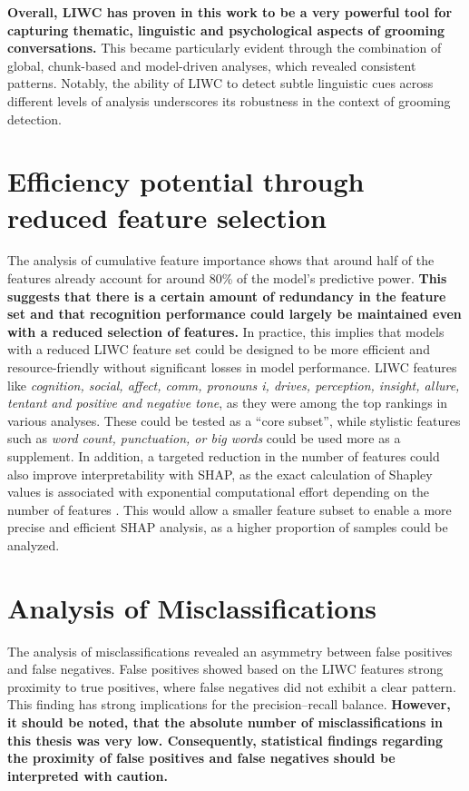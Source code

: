 \textbf{Overall, LIWC has proven in this work to be a very powerful tool for capturing thematic, linguistic and psychological aspects of grooming conversations.} This became particularly evident through the combination of global, chunk-based and model-driven analyses, which revealed consistent patterns. Notably, the ability of LIWC to detect subtle linguistic cues across different levels of analysis underscores its robustness in the context of grooming detection.

\section{Efficiency potential through reduced feature selection}

The analysis of cumulative feature importance shows that around half of the features already account for around 80\% of the model's predictive power. \textbf{This suggests that there is a certain amount of redundancy in the feature set and that recognition performance could largely be maintained even with a reduced selection of features.} In practice, this implies that models with a reduced LIWC feature set could be designed to be more efficient and resource-friendly without significant losses in model performance. LIWC features like \textit{cognition, social, affect, comm, pronouns i, drives, perception, insight, allure, tentant and positive and negative tone}, as they were among the top rankings in various analyses. These could be tested as a “core subset”, while stylistic features such as \textit{word count, punctuation, or big words} could be used more as a supplement. In addition, a targeted reduction in the number of features could also improve interpretability with SHAP, as the exact calculation of Shapley values is associated with exponential computational effort depending on the number of features \cite{fryer2021shapley}. This would allow a smaller feature subset to enable a more precise and efficient SHAP analysis, as a higher proportion of samples could be analyzed.


\section{Analysis of Misclassifications}

The analysis of misclassifications revealed an asymmetry between false positives and false negatives. False positives showed based on the LIWC features strong proximity to true positives, where false negatives did not exhibit a clear pattern. This finding has strong implications for the precision–recall balance. \textbf{However, it should be noted, that the absolute number of misclassifications in this thesis was very low. Consequently, statistical findings regarding the proximity of false positives and false negatives should be interpreted with caution.}

